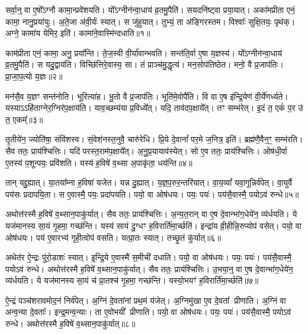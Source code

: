 \setcounter{anuvakam}{0}

सर्वा॒न्॒ वा ए॒षो᳚\-ऽग्नौ कामा॒न्प्रवे॑शयति।
यो᳚ऽग्नीन॑न्वा॒धाय॑ व्र॒तमु॒पैति॑।
सयदनि॑ष्ट्वा प्रया॒यात्।
अका॑मप्रीता एनं॒ कामा॒ नानु॒प्रया॑युः।
अ॒ते॒जा अ॑वी॒र्यः॑ स्यात्।
स जु॑हुयात्।
तुभ्यं॒ ता अ॑ङ्गिरस्तम।
विश्वाः᳚ सुक्षि॒तयः॒ पृथ॑क्।
अग्ने॒ कामा॑य येमिर॒ इति॑।
कामा॑ने॒वास्मि॑न्दधाति॥१॥

काम॑प्रीता एनं॒ कामा॒ अनु॒ प्रया᳚न्ति।
ते॒ज॒स्वी वी॒र्या॑वान्भवति।
सन्त॑ति॒र्वा ए॒षा य॒ज्ञस्य॑।
यो᳚ऽग्नीन॑न्वा॒धाय॑ व्र॒तमु॒पैति॑।
स यदु॒द्वाय॑ति।
विच्छि॑त्तिरे॒वास्य॒ सा।
तं प्राञ्च॑मु॒द्धृत्य॑।
मन॒सोप॑तिष्ठेत।
मनो॒ वै प्र॒जाप॑तिः।
प्रा॒जा॒प॒त्यो य॒ज्ञः॥२॥

मन॑सै॒व य॒ज्ञꣳ सन्त॑नोति।
भूरित्या॑ह।
भू॒तो वै प्र॒जाप॑तिः।
भूति॑मे॒वोपै॑ति।
वि वा ए॒ष इ॑न्द्रि॒येण॑ वी॒र्ये॑णर्ध्यते।
यस्याऽऽहि॑ताग्नेर॒ग्निर॑प॒क्षाय॑ति।
याव॒च्छम्य॑या प्र॒विध्ये᳚त्।
यदि॒ ताव॑दप॒क्षाये᳚त्।
तꣳ सम्भ॑रेत्।
इ॒दं त॒ एकं॑ प॒र उ॑ त॒ एकम्᳚॥३॥

तृ॒तीये॑न॒ ज्योति॑षा॒ संवि॑शस्व।
सं॒वेश॑नस्त॒नुवै॒ चारु॑रेधि।
प्रि॒ये दे॒वानां᳚ पर॒मे ज॒नित्र॒ इति॑।
ब्रह्म॑णै॒वैन॒ꣳ॒ सम्भ॑रति।
सैव ततः॒ प्राय॑श्चित्तिः।
यदि॑ परस्त॒राम॑प॒क्षाये᳚त्।
अ॒नु॒प्र॒यायाव॑स्येत्।
सो ए॒व ततः॒ प्राय॑श्चित्तिः।
ओष॑धी॒र्वा ए॒तस्य॑ प॒शून्पयः॒ प्रवि॑शति।
यस्य॑ ह॒विषे॑ व॒थ्सा अ॒पाकृ॑ता॒ धय॑न्ति॥४॥

तान् यद्दु॒ह्यात्।
या॒तया᳚म्ना ह॒विषा॑ यजेत।
यन्न दु॒ह्यात्।
य॒ज्ञ॒प॒रुर॒न्तरि॑यात्।
वा॒य॒व्यां᳚ यवा॒गून्निर्व॑पेत्।
वा॒युर्वै पय॑सः प्रदापयि॒ता।
स ए॒वास्मै॒ पयः॒ प्रदा॑पयति।
पयो॒ वा ओष॑धयः।
पयः॒ पयः॑।
पय॑सै॒वास्मै॒ पयो\-ऽव॑ रुन्धे॥५॥

अथोत्त॑रस्मै ह॒विषे॑ व॒थ्सान॒पाकु॑र्यात्।
सैव ततः॒ प्राय॑श्चित्तिः।
अ॒न्य॒त॒रान् वा ए॒ष दे॒वान्भा॑ग॒धेये॑न॒ व्य॑र्धयति।
ये यज॑मानस्य सा॒यं गृ॒हमा॒ गच्छ॑न्ति।
यस्य॑ सायं दु॒ग्धꣳ ह॒विरार्ति॑मा॒र्च्छति॑।
इन्द्रा॑य व्री॒हीन्नि॒रुप्योप॑ वसेत्।
पयो॒ वा ओष॑धयः।
पय॑ ए॒वारभ्य॑ गृही॒त्वोप॑ वसति।
यत्प्रा॒तः स्यात्।
तच्छृ॒तं कु॑र्यात्॥६॥

अथेत॑र ऐ॒न्द्रः पु॑रो॒डाशः॑ स्यात्।
इ॒न्द्रि॒ये ए॒वास्मै॑ स॒मीची॑ दधाति।
पयो॒ वा ओष॑धयः।
पयः॒ पयः॑।
पय॑सै॒वास्मै॒ पयो\-ऽव॑ रुन्धे।
अथोत्त॑रस्मै ह॒विषे॑ व॒थ्सान॒पाकु॑र्यात्।
सैव ततः॒ प्राय॑श्चित्तिः।
उ॒भया॒न्॒ वा ए॒ष दे॒वान्भा॑ग॒धेये॑न॒ व्य॑र्धयति।
ये यज॑मानस्य सा॒यं च॑ प्रा॒तश्च॑ गृ॒हमा॒ गच्छ॑न्ति।
यस्यो॒भयꣳ॑ ह॒विरार्ति॑मा॒र्च्छति॑॥७॥

ऐ॒न्द्रं पञ्च॑शरावमोद॒नं निर्व॑पेत्।
अ॒ग्निं दे॒वता॑नां प्रथ॒मं य॑जेत्।
अ॒ग्निमु॑खा ए॒व दे॒वता᳚ प्रीणाति।
अ॒ग्निं वा अन्व॒न्या दे॒वताः᳚।
इन्द्र॒मन्व॒न्याः।
ता ए॒वोभयी᳚ प्रीणाति।
पयो॒ वा ओष॑धयः।
पयः॒ पयः॑।
पय॑सै॒वास्मै॒ पयो\-ऽव॑ रुन्धे।
अथोत्त॑रस्मै ह॒विषे॑ व॒थ्सान॒पाकु॑र्यात्॥८॥

